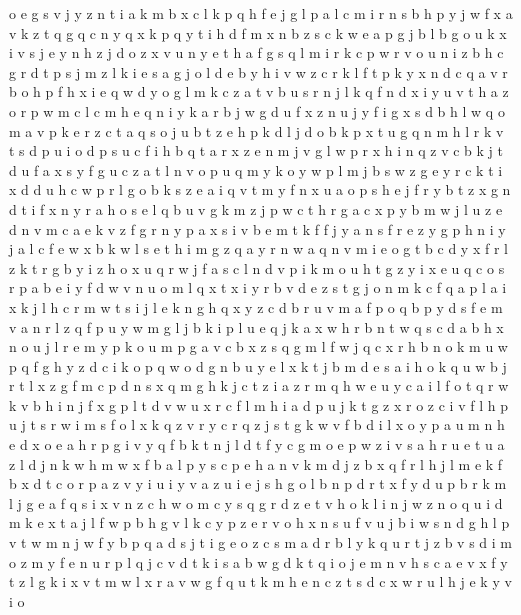 \documentclass{article}
\begin{document}
o e g s v j y z n t i a k m b
x c l k p q
h f e j g l p a
l c m i r n s b h p y j w f x a v k z t q g
q c
n y q x
k p q
y t i h d f m x n b z s c k w e a p g j
b
l b g o u k x i v s j e y n h z
j d o z x v u n y e t h a f g s q l m i r k c p w
r
v o u n i z b h c g r d t p s j
m z l k i e s a
g j o l d e b y h i v w z c r k
l f t p k y x n d c q a v r b o h
p f h x i e q w d y o g l m k c z a t v b u s r n j
l k q f n d x i y u v t h a z o r p w m c
l c m h e q n i y k a r b j w g d u f x
z
n u j y f i g x s d b h l w q o m a v p k e r z c t
a q s o j u b t z e h p k d l
j d o b k p x t u g
q n m h l r k v t s d p u i
o d p s u c f i h b q t a r x z e n m j v g l
w p r x h i n q z v c b k j t d u f a
x s y f g u c z a t l n v o p
u q m y k o
y w
p l m j b s w z g e y r c k t i x d
d u h c w p r l g o b k s z e a i q v t m y f n x
u a o p s h e j f r y b t z x g n
d t i f x n y r a h o s e l q b u v g k m z j p w c
t h r g a c x p y b m w j l u z e d n v
m c a e k v z f g r n
y p a x s i v b e m t k f
f j y a n
s f r e z y
g
p h n i y j a l c f e w x b
k w l s e t h i m g z q a y r n
w a q n v m i e o g t b c d y x f r l z
k t r g b y i z h o x u
q r w j f a s c l n d v p i k m o u h t g z y
i x e u q c o s r
p a b e i y f d w v n u o m l q x t
x i y r b v d e z s t g j o n m k c f q a p l
a i x k j l h c r m
w t s i j l e k n g h q x y z c d b r u v m a f p o
q b p y d s f e m v a n r l
z q f p u y w m g l j b k
i p l u e q j k a x w h r b n
t w q s c d a b h x n o u j l r e m y p k
o u m p g a v c b x z s q
g m l f w j q c x r h b n o k
m u w p q f g h y z d c i k o
p q w o d g n b u y e
l x k t j b m d
e s a i h o k q u w b j r t l x z g f m c p d n
s x q m g h k j c t z
i a
z r m q h w
e u y
c a i l f o t q r w k v
b h i n j f x g p l t d v w
u x r c f
l m h i a d p u j k t g z x r o
z c i v f l h p u j t s r w
i m s f o l x k q z v r y
c r q z j s t g k w v f b d i l x o y p a u m n h e
d x o e a h r p g i v y q f b k t n j
l d t f y c g m o e p w z i v s a h r u
e t u a z l d j n k w
h m w x f b a l p
y s c p e h a n v k m d j z b x q f r l
h j l m e k f b x d t c o r p a z v y i u
i y
v a z u i e j s h g o l b n p d r t x f
y d u p b r k m l j g e a f q s i x v n z c h w o
m c y s q g r d z e t v h o k l i n j w
z n o q u i d m k e x t a j l f w p b h g v
l k c y p z e r v o h x n s u f
v u j b i w s n d g h l
p v t w m n
j w
f y b p q a d s j
t i g e o z c s m a d r b l y k q
u r t j z b v s d i m
o z m y f e n u r p l q j c v d t k i s a b w g
d k t q i o j e m n v h s c a
e v x f y t
z l g k i x v t m w
l x r a v w g f q u t k m h e n c
z t s d c x w r u l h j e k y v i o
\end{document}
